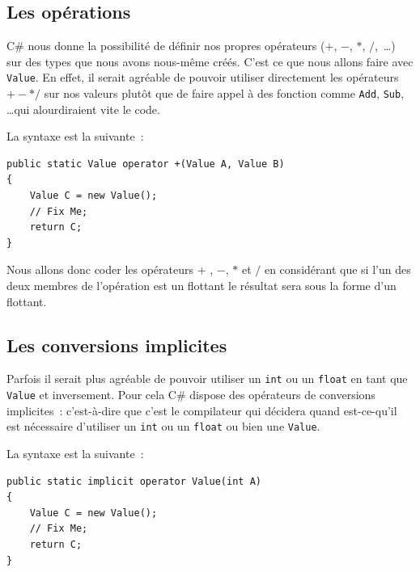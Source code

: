 \documentclass[12pt,a4paper]{report}
\begin{document}

\subsection{Les opérations}

C\# nous donne la possibilité de définir nos propres opérateurs ($+$, $-$, $*$, $/$,~\ldots) sur des types que nous avons nous-même créés. C'est ce que nous allons faire avec \texttt{Value}. En effet, il serait agréable de pouvoir utiliser directement les opérateurs $+-*/$ sur nos valeurs plutôt que de faire appel à des fonction comme \texttt{Add}, \texttt{Sub}, \ldots qui alourdiraient vite le code.

La syntaxe est la suivante~:

\begin{lstlisting}
public static Value operator +(Value A, Value B)
{
	Value C = new Value();
	// Fix Me;
	return C;
}
\end{lstlisting}


Nous allons donc coder les opérateurs $+$ , $-$, $*$ et $/$ en considérant que si l'un des deux membres de l'opération est un flottant le résultat sera sous la forme d'un flottant.

\subsection{Les conversions implicites}

Parfois il serait plus agréable de pouvoir utiliser un \texttt{int} ou un \texttt{float} en tant que \texttt{Value} et inversement. Pour cela C\# dispose des opérateurs de conversions implicites~: c'est-à-dire que c'est le compilateur qui décidera quand est-ce-qu'il est nécessaire d'utiliser un \texttt{int} ou un \texttt{float} ou bien une \texttt{Value}.

La syntaxe est la suivante~:

\begin{lstlisting}
public static implicit operator Value(int A)
{
	Value C = new Value();
	// Fix Me;
	return C;
}
\end{lstlisting}

\end{document}
